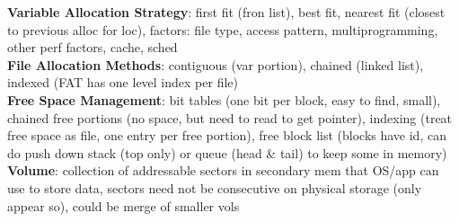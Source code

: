 \documentclass[a4paper]{article}
\begin{document}
\begin{multicols}{2}
        \textbf{Variable Allocation Strategy}: first fit (fron list), best fit, nearest fit (closest to previous alloc for loc), factors: file type, access pattern, multiprogramming, other perf factors, cache, sched\\
        \textbf{File Allocation Methods}: contiguous (var portion), chained (linked list), indexed (FAT has one level index per file)\\
        \textbf{Free Space Management}: bit tables (one bit per block, easy to find, small), chained free portions (no space, but need to read to get pointer), indexing (treat free space as file, one entry per free portion), free block list (blocks have id, can do push down stack (top only) or queue (head \& tail) to keep some in memory)
        \textbf{Volume}: collection of addressable sectors in secondary mem that OS/app can use to store data, sectors need not be consecutive on physical storage (only appear so), could be merge of smaller vols\\
    \end{multicols}
    
\end{document}
